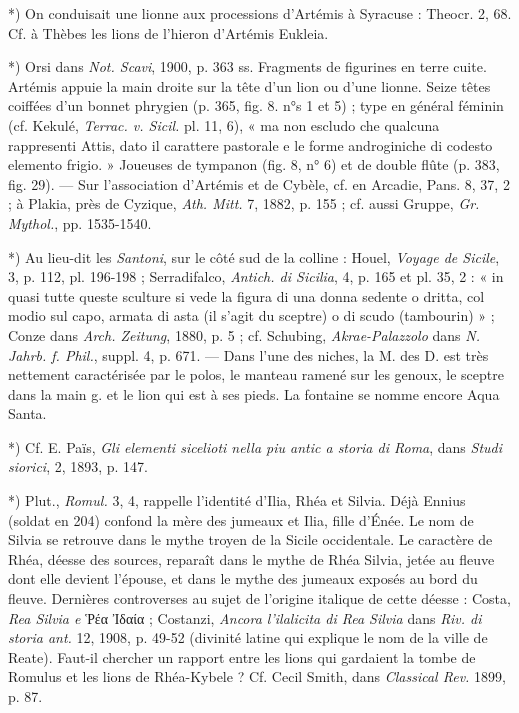 \documentclass[a4paper, 11pt, oneside, polutonikogreek, french]{article}
\begin{document}
*) On conduisait une lionne aux processions d'Artémis à Syracuse : Theocr. 2, 68. Cf. à Thèbes les lions de l'hieron d'Artémis Eukleia.

*) Orsi dans \emph{Not. Scavi}, 1900, p. 363 ss. Fragments de figurines en terre cuite. Artémis appuie la main droite sur la tête d'un lion ou d'une lionne. Seize têtes coiffées d'un bonnet phrygien (p. 365, fig. 8. n°s 1 et 5) ; type en général féminin (cf. Kekulé, \emph{Terrac. v. Sicil.} pl. 11, 6), « ma non escludo che qualcuna rappresenti Attis, dato il carattere pastorale e le forme androginiche di codesto elemento frigio. » Joueuses de tympanon (fig. 8, n° 6) et de double flûte (p. 383, fig. 29). --- Sur l'association d'Artémis et de Cybèle, cf. en Arcadie, Pans. 8, 37, 2 ; à Plakia, près de Cyzique, \emph{Ath. Mitt.} 7, 1882, p. 155 ; cf. aussi Gruppe, \emph{Gr. Mythol.}, pp. 1535-1540.

*) Au lieu-dit les \emph{Santoni}, sur le côté sud de la colline : Houel, \emph{Voyage de Sicile}, 3, p. 112, pl. 196-198 ; Serradifalco, \emph{Antich. di Sicilia}, 4, p. 165 et pl. 35, 2 : « in quasi tutte queste sculture si vede la figura di una donna sedente o dritta, col modio sul capo, armata di asta (il s'agit du sceptre) o di scudo (tambourin) » ; Conze dans \emph{Arch. Zeitung}, 1880, p. 5 ; cf. Schubing, \emph{Akrae-Palazzolo} dans \emph{N. Jahrb. f. Phil.}, suppl. 4, p. 671. --- Dans l'une des niches, la M. des D. est très nettement caractérisée par le polos, le manteau ramené sur les genoux, le sceptre dans la main g. et le lion qui est à ses pieds. La fontaine se nomme encore Aqua Santa.

*) Cf. E. Païs, \emph{Gli elementi sicelioti nella piu antic a storia di Roma}, dans \emph{Studi siorici}, 2, 1893, p. 147.

*) Plut., \emph{Romul.} 3, 4, rappelle l'identité d'Ilia, Rhéa et Silvia. Déjà Ennius (soldat en 204) confond la mère des jumeaux et Ilia, fille d'Énée. Le nom de Silvia se retrouve dans le mythe troyen de la Sicile occidentale. Le caractère de Rhéa, déesse des sources, reparaît dans le mythe de Rhéa Silvia, jetée au fleuve dont elle devient l'épouse, et dans le mythe des jumeaux exposés au bord du fleuve. Dernières controverses au sujet de l'origine italique de cette déesse : Costa, \emph{Rea Silvia e} Ῥέα Ἰδαία ; Costanzi, \emph{Ancora l'ilalicita di Rea Silvia} dans \emph{Riv. di storia ant.} 12, 1908, p. 49-52 (divinité latine qui explique le nom de la ville de Reate). Faut-il chercher un rapport entre les lions qui gardaient la tombe de Romulus et les lions de Rhéa-Kybele ? Cf. Cecil Smith, dans \emph{Classical Rev.} 1899, p. 87.
\end{document}
